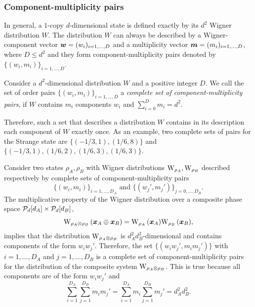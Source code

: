 \documentclass[pra,
aps,
twocolumn,
superscriptaddress,
groupedaddress,
nofootinbib,
reprint
]{revtex4-1}
\begin{document}
\subsubsection{Component-multiplicity pairs}


In general, a $1$-copy $d$-dimensional state is defined exactly by its $d^2$ Wigner distribution $W$. 
The distribution $W$ can always be described by a Wigner-component vector $\bmw = (w_i)_{i=1,\dots,D}$ and a multiplicity vector $\bmm = (m_i)_{i=1,\dots,D}$, where $D \leq d^2$ and they form component-multiplicity pairs denoted by $\{(w_i, m_i)\}_{i=1,\dots,D}$.
\begin{definition}
	Consider a $d^2$-dimensional distribution $W$ and a positive integer $D$. 
	We call the set of order pairs $\{(w_i, m_i)\}_{i=1,\dots,D}$ a \emph{complete set of component-multiplicity pairs}, if $W$ contains $m_i$ components $w_i$ and $\sum_{i=0}^D m_i = d^2$.
\end{definition}
Therefore, such a set that describes a distribution $W$ contains in its description each component of $W$ exactly once.
As an example, two complete sets of pairs for the Strange state are $\{( -1/3, 1), ( 1/6, 8)\}$ and $\{(-1/3, 1), (1/6, 2), (1/6, 3), (1/6, 3)\}$.

Consider two states $\rho_A, \rho_B$ with Wigner distributions $\W{\rho_A}, \W{\rho_B}$ described respectively by complete sets of component-multiplicity pairs 
\begin{equation}
	\{(w_i, m_i)\}_{i=1,\dots,D_A} \text{ and } \{(w_j', m_j')\}_{j=0,\dots,D_B}.
\end{equation}
The multiplicative property of the Wigner distribution over a composite phase space $\cal{P}_d[d_A] \times \cal{P}_d[d_B]$,
\begin{equation}
	\W[\bmx_A \oplus \bmx_B]{\rho_A \otimes \rho_B} = \W[\bmx_A]{\rho_A}\W[\bmx_B]{\rho_B},
\end{equation}
implies that the distribution $\W{\rho_A \otimes \rho_B}$ is $d_A^2 d_B^2$-dimensional and contains components of the form $w_i w_j'$. 
Therefore, the set $\{(w_i w_j', m_i m_j')\}$ with $i=1,\dots,D_A$ and $j=1,\dots,D_B$ is a complete set of component-multiplicity pairs for the distribution of the composite system $\W{\rho_A \otimes \rho_B}$.
This is true because all components are of the form $w_i w_j'$ and 
\begin{equation*}
	\sum_{i=1}^{D_A}\sum_{j=1}^{D_B} m_i m_j' = \sum_{i=1}^{D_A} m_i \sum_{j=1}^{D_B} m_j' = d_A^2 d_B^2.
\end{equation*}
\end{document}
